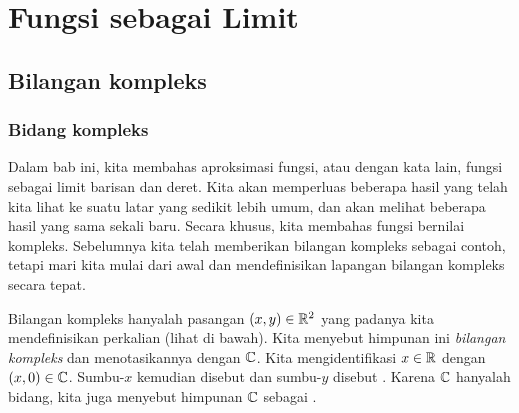 
\chapter{Fungsi sebagai Limit} \label{approx:chapter}


\section{Bilangan kompleks}
\label{sec:complexnums}



\subsection{Bidang kompleks}

Dalam bab ini, kita membahas aproksimasi fungsi, atau dengan kata lain,
fungsi sebagai limit barisan dan deret.
Kita akan memperluas beberapa hasil yang telah kita lihat ke suatu
latar yang sedikit lebih umum, dan akan melihat beberapa hasil yang sama sekali baru.
Secara khusus, kita membahas fungsi bernilai kompleks.
Sebelumnya kita telah memberikan bilangan kompleks sebagai contoh, tetapi
mari kita mulai dari awal dan mendefinisikan lapangan bilangan kompleks secara tepat.

Bilangan kompleks hanyalah pasangan $(x,y) \in {\mathbb{R}}^2$ yang padanya kita
mendefinisikan perkalian (lihat di bawah).
Kita menyebut himpunan ini \emph{bilangan kompleks}
dan menotasikannya dengan ${\mathbb{C}}$.
Kita mengidentifikasi $x \in {\mathbb{R}}$ dengan $(x,0) \in {\mathbb{C}}$.
Sumbu-$x$ kemudian disebut \emph{} dan sumbu-$y$ disebut
\emph{}.
Karena ${\mathbb{C}}$ hanyalah bidang, kita juga menyebut himpunan ${\mathbb{C}}$ sebagai
\emph{}.

